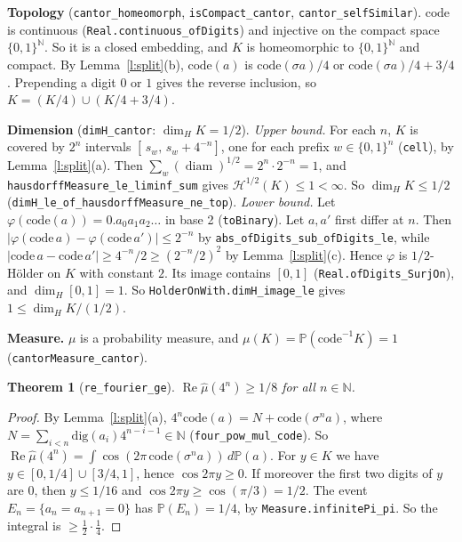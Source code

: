 \documentclass[11pt]{article}
\newtheorem{theorem}{Theorem}
\theoremstyle{definition}
\begin{document}
\textbf{Topology} (\texttt{cantor\_homeomorph}, \texttt{isCompact\_cantor},
\texttt{cantor\_selfSimilar}). $\mathrm{code}$ is continuous (\texttt{Real.continuous\_ofDigits}) and
injective on the compact space $\{0,1\}^{\mathbb{N}}$. So it is a closed embedding, and $K$ is
homeomorphic to $\{0,1\}^{\mathbb{N}}$ and compact. By Lemma~\ref{l:split}(b), $\mathrm{code}(a)$ is
$\mathrm{code}(\sigma a)/4$ or $\mathrm{code}(\sigma a)/4+3/4$. Prepending a digit $0$ or $1$ gives
the reverse inclusion, so $K=(K/4)\cup(K/4+3/4)$.

\textbf{Dimension} (\texttt{dimH\_cantor}: $\dim_H K=1/2$).
\emph{Upper bound.} For each $n$, $K$ is covered by $2^n$ intervals
$[\,s_w,\,s_w+4^{-n}]$, one for each prefix $w\in\{0,1\}^n$ (\texttt{cell}), by
Lemma~\ref{l:split}(a). Then $\sum_w(\operatorname{diam})^{1/2}=2^n\cdot2^{-n}=1$, and
\texttt{hausdorffMeasure\_le\_liminf\_sum} gives $\mathcal H^{1/2}(K)\le1<\infty$. So
$\dim_H K\le1/2$ (\texttt{dimH\_le\_of\_hausdorffMeasure\_ne\_top}).
\emph{Lower bound.} Let $\varphi(\mathrm{code}(a))=0.a_0a_1a_2\ldots$ in base 2 (\texttt{toBinary}).
Let $a,a'$ first differ at $n$. Then $|\varphi(\mathrm{code}\,a)-\varphi(\mathrm{code}\,a')|\le2^{-n}$
by \texttt{abs\_ofDigits\_sub\_ofDigits\_le}, while
$|\mathrm{code}\,a-\mathrm{code}\,a'|\ge4^{-n}/2\ge(2^{-n}/2)^2$ by Lemma~\ref{l:split}(c). Hence
$\varphi$ is $1/2$-H\"older on $K$ with constant $2$. Its image contains $[0,1]$
(\texttt{Real.ofDigits\_SurjOn}), and $\dim_H[0,1]=1$. So
\texttt{HolderOnWith.dimH\_image\_le} gives $1\le\dim_H K/(1/2)$.

\textbf{Measure.} $\mu$ is a probability measure, and $\mu(K)=\mathbb{P}(\mathrm{code}^{-1}K)=1$
(\texttt{cantorMeasure\_cantor}).

\begin{theorem}[\texttt{re\_fourier\_ge}]
$\operatorname{Re}\hat\mu(4^n)\ge1/8$ for all $n\in\mathbb{N}$.
\end{theorem}
\begin{proof}
By Lemma~\ref{l:split}(a), $4^n\mathrm{code}(a)=N+\mathrm{code}(\sigma^na)$, where
$N=\sum_{i<n}\mathrm{dig}(a_i)4^{n-i-1}\in\mathbb{N}$ (\texttt{four\_pow\_mul\_code}). So
$\operatorname{Re}\hat\mu(4^n)=\int\cos(2\pi\,\mathrm{code}(\sigma^na))\,d\mathbb{P}(a)$. For
$y\in K$ we have $y\in[0,1/4]\cup[3/4,1]$, hence $\cos2\pi y\ge0$. If moreover the first two digits of
$y$ are $0$, then $y\le1/16$ and $\cos2\pi y\ge\cos(\pi/3)=1/2$. The event
$E_n=\{a_n=a_{n+1}=0\}$ has $\mathbb{P}(E_n)=1/4$, by \texttt{Measure.infinitePi\_pi}. So the integral
is $\ge\tfrac12\cdot\tfrac14$.
\end{proof}
\end{document}
